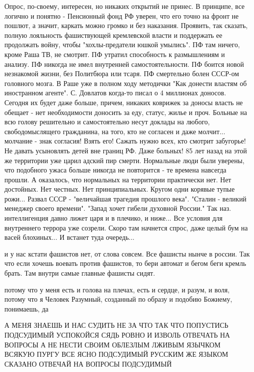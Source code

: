 Опрос, по-своему, интересен, но никаких открытий не принес. 
В принципе, все логично и понятно - 
Пенсионный фонд РФ уверен, что его точно на фронт не пошлют, а значит, каркать можно громко и без наказания. Проявить, так сказать, полную лояльность фашиствующей кремлевской власти и поддержать ее продолжать войну, чтобы "хохлы-предатели юшкой умылись".
ПФ там ничего, кроме Раша ТВ, не смотрит.
ПФ утратил способность к размышлениям и анализу.
ПФ никогда не имел внутренней самостоятельности.
ПФ боится новой незнакомой жизни, без Политбюра или тсаря.
ПФ смертельно болен СССР-ом головного мозга. 
В Раше уже в полном ходу методички "Как донести властям об иностранном агенте". С. Довлатов когда-то писал о 4 миллионах доносов. Сегодня их будет даже больше, причем, никаких коврижек за доносы власть не обещает - нет необходимости доносить за еду, статус, жилье и проч. 
Больные на всю голову решительно и самостоятельно несут доклады на любого, свободомыслящего гражданина, на того, кто не согласен и даже молчит... молчание - знак согласия! Взять его! Сажать нужно всех, кто смотрит забугорье! 
Не давать усыновлять детей вне границ РФ. Даже больных! 
85 лет назад на этой же территории уже царил адский пир смерти. Нормальные люди были уверены, что подобного ужаса больше никогда не повторится - те времена навсегда прошли.
А оказалось, что нормальных на территории практически нет. Нет достойных. Нет честных. Нет принципиальных. 
Кругом одни корявые тупые рожи...
Развал СССР - "величайшая трагедия прошлого века".
"Сталин - великий менеджер своего времени".
"Запад хочет гибели духовной России."
Так наз. интеллигенция давно лижет царя и в плечико, и ниже... 
Все условия для внутреннего террора уже созрели. 
Скоро там начнется спрос, даже целый бум на васей блохиных... 
И встанет туда очередь...





и у нас кстати фашистов нет, от слова совсем. Все фашисты нынче в россии. Так
что если хочешь воевать против фашистов, то бери автомат и бегом беги кремль
брать. Там внутри самые главные фашисты сидят.

потому что у меня есть и голова на плечах, есть и сердце, и разум, и воля,
потому что я Человек Разумный, созданный по образу и подобию Божиему,
понимаешь, да





А МЕНЯ ЗНАЕШЬ И НАС СУДИТЬ НЕ ЗА ЧТО ТАК ЧТО ПОПУСТИСЬ ПОДСУДИМЫЙ УСПОКОЙСЯ
СЯДЬ РОВНО И ИЗВОЛЬ ОТВЕЧАТЬ НА ВОПРОСЫ А НЕ НЕСТИ СВОИМ ОБЛЕЗЛЫМ ЛЖИВЫМ
ЯЗЫЧКОМ ВСЯКУЮ ПУРГУ ВСЕ ЯСНО ПОДСУДИМЫЙ РУССКИМ ЖЕ ЯЗЫКОМ СКАЗАНО ОТВЕЧАЙ НА
ВОПРОСЫ ПОДСУДИМЫЙ

